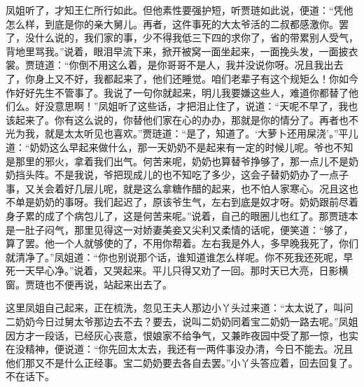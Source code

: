 \begin{parag}
    凤姐听了，才知王仁所行如此。但他素性要强护短，听贾琏如此说，便道：“凭他怎么样，到底是你的亲大舅儿。再者，这件事死的大太爷活的二叔都感激你。罢了，没什么说的，我们家的事，少不得我低三下四的求你了，省的带累别人受气，背地里骂我。”说着，眼泪早流下来，掀开被窝一面坐起来，一面挽头发，一面披衣裳。贾琏道：“你倒不用这么着，是你哥哥不是人，我并没说你呀。况且我出去了，你身上又不好，我都起来了，他们还睡觉。咱们老辈子有这个规矩么！你如今作好好先生不管事了。我说了一句你就起来，明儿我要嫌这些人，难道你都替了他们么。好没意思啊！”凤姐听了这些话，才把泪止住了，说道：“天呢不早了，我也该起来了。你有这么说的，你替他们家在心的办办，那就是你的情分了。再者也不光为我，就是太太听见也喜欢。”贾琏道：“是了，知道了。‘大萝卜还用屎浇’。”平儿道：“奶奶这么早起来做什么，那一天奶奶不是起来有一定的时候儿呢。爷也不知是那里的邪火，拿着我们出气。何苦来呢，奶奶也算替爷挣够了，那一点儿不是奶奶挡头阵。不是我说，爷把现成儿的也不知吃了多少，这会子替奶奶办了一点子事，又关会着好几层儿呢，就是这么拿糖作醋的起来，也不怕人家寒心。况且这也不单是奶奶的事呀。我们起迟了，原该爷生气，左右到底是奴才呀。奶奶跟前尽着身子累的成了个病包儿了，这是何苦来呢。”说着，自己的眼圈儿也红了。那贾琏本是一肚子闷气，那里见得这一对娇妻美妾又尖利又柔情的话呢，便笑道：“够了，算了罢。他一个人就够使的了，不用你帮着。左右我是外人，多早晚我死了，你们就清净了。”凤姐道：“你也别说那个话，谁知道谁怎么样呢。你不死我还死呢，早死一天早心净。”说着，又哭起来。平儿只得又劝了一回。那时天已大亮，日影横窗。贾琏也不便再说，站起来出去了。
\end{parag}


\begin{parag}
    这里凤姐自己起来，正在梳洗，忽见王夫人那边小丫头过来道：“太太说了，叫问二奶奶今日过舅太爷那边去不去？要去，说叫二奶奶同着宝二奶奶一路去呢。”凤姐因方才一段话，已经灰心丧意，恨娘家不给争气，又兼昨夜园中受了那一惊，也实在没精神，便说道：“你先回太太去，我还有一两件事没办清，今日不能去。况且他们那又不是什么正经事。宝二奶奶要去各自去罢。”小丫头答应着，回去回复了。不在话下。
\end{parag}


